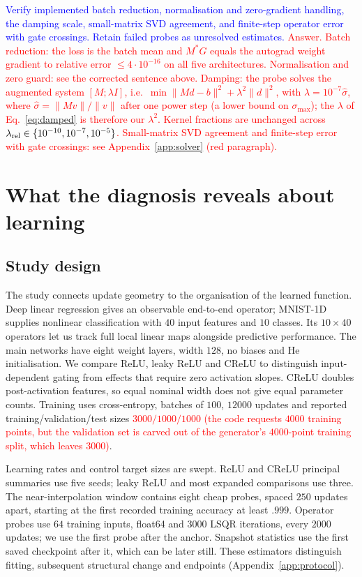 \documentclass{article}
\newcommand{\zied}[1]{\textcolor{blue}{#1}}
\newcommand{\nat}[1]{\textcolor{red}{#1}}
\theoremstyle{definition}
\theoremstyle{remark}
\begin{document}
\zied{Verify implemented batch reduction, normalisation and zero-gradient handling, the damping scale, small-matrix SVD agreement, and finite-step operator error with gate crossings. Retain failed probes as unresolved estimates.}
\nat{Answer. Batch reduction: the loss is the batch mean and $M^*G$ equals the autograd weight gradient to relative error $\le4\cdot10^{-16}$ on all five architectures. Normalisation and zero guard: see the corrected sentence above. Damping: the probe solves the augmented system $[M;\lambda I]$, i.e.\ $\min\|Md-b\|^2+\lambda^2\|d\|^2$, with $\lambda=10^{-7}\hat\sigma$, where $\hat\sigma=\|Mv\|/\|v\|$ after one power step (a lower bound on $\sigma_{\max}$); the $\lambda$ of Eq.~\eqref{eq:damped} is therefore our $\lambda^2$. Kernel fractions are unchanged across $\lambda_{\rm rel}\in\{10^{-10},10^{-7},10^{-5}\}$. Small-matrix SVD agreement and finite-step error with gate crossings: see Appendix~\ref{app:solver} (red paragraph).}

\section{What the diagnosis reveals about learning}
\label{sec:experiments}

\subsection{Study design}

The study connects update geometry to the organisation of the learned function. Deep linear regression gives an observable end-to-end operator; MNIST-1D \citep{greydanus2020mnist1d} supplies nonlinear classification with $40$ input features and $10$ classes. Its $10\times40$ operators let us track full local linear maps alongside predictive performance. The main networks have eight weight layers, width $128$, no biases and He initialisation. We compare ReLU, leaky ReLU and CReLU to distinguish input-dependent gating from effects that require zero activation slopes. CReLU doubles post-activation features, so equal nominal width does not give equal parameter counts. Training uses cross-entropy, batches of $100$, $12000$ updates and reported training/validation/test sizes \nat{$3000/1000/1000$ (the code requests $4000$ training points, but the validation set is carved out of the generator's $4000$-point training split, which leaves $3000$)}.

Learning rates and control target sizes are swept. ReLU and CReLU principal summaries use five seeds; leaky ReLU and most expanded comparisons use three. The near-interpolation window contains eight cheap probes, spaced $250$ updates apart, starting at the first recorded training accuracy at least $.999$. Operator probes use $64$ training inputs, float64 and $3000$ LSQR iterations, every $2000$ updates; we use the first probe after the anchor. Snapshot statistics use the first saved checkpoint after it, which can be later still. These estimators distinguish fitting, subsequent structural change and endpoints (Appendix~\ref{app:protocol}).
\end{document}
